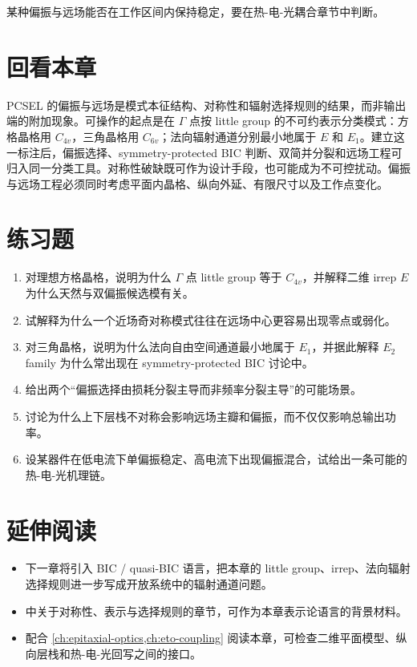 某种偏振与远场能否在工作区间内保持稳定，要在热-电-光耦合章节中判断。

\section*{回看本章}
PCSEL 的偏振与远场是模式本征结构、对称性和辐射选择规则的结果，而非输出端的附加现象。可操作的起点是在 $\Gamma$ 点按 little group 的不可约表示分类模式：方格晶格用 $C_{4v}$，三角晶格用 $C_{6v}$；法向辐射通道分别最小地属于 $E$ 和 $E_1$。建立这一标注后，偏振选择、symmetry-protected BIC 判断、双简并分裂和远场工程可归入同一分类工具。对称性破缺既可作为设计手段，也可能成为不可控扰动。偏振与远场工程必须同时考虑平面内晶格、纵向外延、有限尺寸以及工作点变化。

\section*{练习题}
\begin{enumerate}
  \item \basicq 对理想方格晶格，说明为什么 $\Gamma$ 点 little group 等于 $C_{4v}$，并解释二维 irrep $E$ 为什么天然与双偏振候选模有关。

  \item \basicq 试解释为什么一个近场奇对称模式往往在远场中心更容易出现零点或弱化。

  \item \midq 对三角晶格，说明为什么法向自由空间通道最小地属于 $E_1$，并据此解释 $E_2$ family 为什么常出现在 symmetry-protected BIC 讨论中。

  \item \midq 给出两个“偏振选择由损耗分裂主导而非频率分裂主导”的可能场景。

  \item \midq 讨论为什么上下层栈不对称会影响远场主瓣和偏振，而不仅仅影响总输出功率。

  \item \hardq 设某器件在低电流下单偏振稳定、高电流下出现偏振混合，试给出一条可能的热-电-光机理链。
\end{enumerate}

\section*{延伸阅读}
\begin{itemize}
  \item 下一章将引入 BIC / quasi-BIC 语言，把本章的 little group、irrep、法向辐射选择规则进一步写成开放系统中的辐射通道问题。

  \item \cite{sakoda2005,joannopoulos2008} 中关于对称性、表示与选择规则的章节，可作为本章表示论语言的背景材料。

  \item 配合 \cref{ch:epitaxial-optics,ch:eto-coupling} 阅读本章，可检查二维平面模型、纵向层栈和热-电-光回写之间的接口。
\end{itemize}
